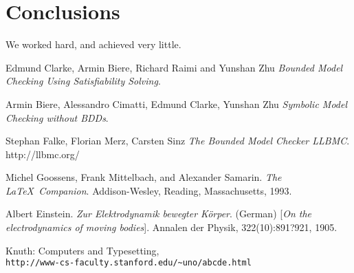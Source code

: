 \documentclass[14pt]{article}
\begin{document}
\section{Conclusions}\label{conclusions}
We worked hard, and achieved very little.

\begin{thebibliography}{9}
Edmund Clarke, Armin Biere, Richard Raimi and Yunshan Zhu
\textit{Bounded Model Checking Using Satisfiability Solving}.

Armin Biere, Alessandro Cimatti, Edmund Clarke, Yunshan Zhu
\textit{Symbolic Model Checking without BDDs}. 

Stephan Falke, Florian Merz, Carsten Sinz
\textit{The Bounded Model Checker LLBMC}. 
http://llbmc.org/





Michel Goossens, Frank Mittelbach, and Alexander Samarin. 
\textit{The \LaTeX\ Companion}. 
Addison-Wesley, Reading, Massachusetts, 1993.
 
Albert Einstein. 
\textit{Zur Elektrodynamik bewegter K{\"o}rper}. (German) 
[\textit{On the electrodynamics of moving bodies}]. 
Annalen der Physik, 322(10):891?921, 1905.
 
Knuth: Computers and Typesetting,
\\\texttt{http://www-cs-faculty.stanford.edu/\~{}uno/abcde.html}
\end{thebibliography}
\end{document}
